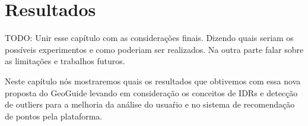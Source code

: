 \chapter{Resultados}

TODO: Unir esse capítulo com as considerações finais. Dizendo quais seriam os possíveis experimentos e como poderiam ser realizados. Na outra parte falar sobre as limitações e trabalhos futuros.

Neste capítulo nós mostraremos quais os resultados que obtivemos com essa nova proposta do GeoGuide levando em consideração os conceitos de IDRs e detecção de outliers para a melhoria da análise do usuaŕio e no sistema de recomendação de pontos pela plataforma.









